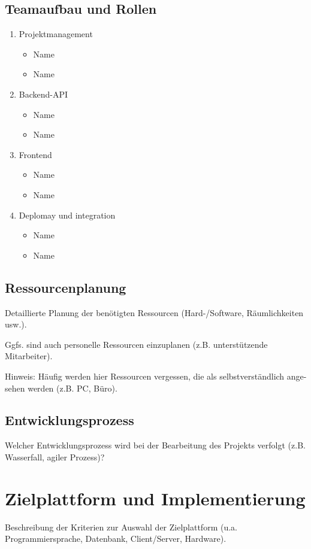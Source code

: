 \documentclass[a4paper,12pt]{article}
\begin{document}
\subsection{Teamaufbau und Rollen}
\begin{enumerate}
    \item Projektmanagement
    \begin{itemize}
        \item Name
        \item Name
    \end{itemize}
    \item Backend-API
    \begin{itemize}
        \item Name
        \item Name
    \end{itemize}
    \item Frontend
    \begin{itemize}
        \item Name
        \item Name
    \end{itemize}
    \item Deplomay und integration
    \begin{itemize}
        \item Name
        \item Name
    \end{itemize}
\end{enumerate}

\subsection{Ressourcenplanung}
Detaillierte Planung der benötigten Ressourcen
(Hard-/Software, Räumlichkeiten usw.).

Ggfs. sind auch personelle Ressourcen einzuplanen (z.B. unterstützende
Mitarbeiter).

Hinweis: Häufig werden hier Ressourcen vergessen, die als selbstverständlich
ange- sehen werden (z.B. PC, Büro).

\subsection{Entwicklungsprozess}
Welcher Entwicklungsprozess wird bei der
Bearbeitung des Projekts verfolgt (z.B.  Wasserfall, agiler Prozess)?

\newpage \section{Zielplattform und Implementierung}
Beschreibung der Kriterien
zur Auswahl der Zielplattform (u.a. Programmiersprache, Datenbank,
Client/Server, Hardware).
\end{document}

